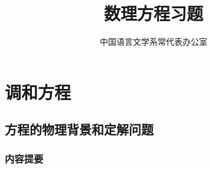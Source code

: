 \documentclass[12pt, a4paper]{ctexart}
\title{数理方程习题}
\author{中国语言文学系常代表办公室}
\begin{document}
	\maketitle

	\newpage
	\tableofcontents
	\newpage
	\section{调和方程}
    \subsection{方程的物理背景和定解问题}
    \subsubsection{内容提要}
    
\end{document}
